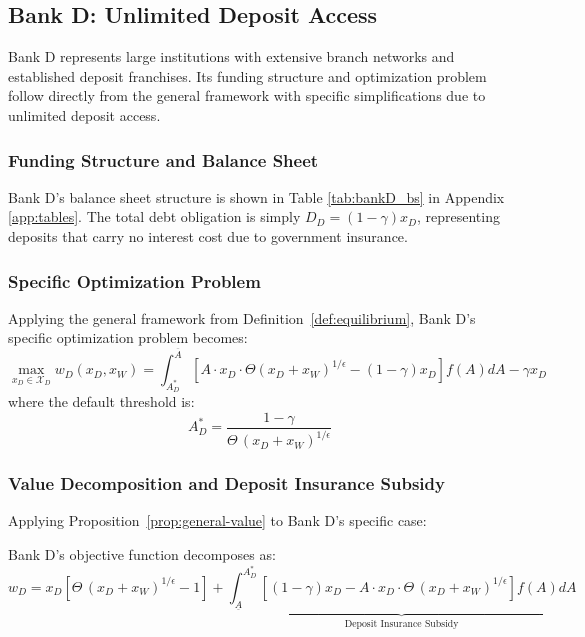 \documentclass[12pt]{article}
\begin{document}
\subsection{Bank D: Unlimited Deposit Access}
Bank D represents large institutions with extensive branch networks and established deposit franchises. Its funding structure and optimization problem follow directly from the general framework with specific simplifications due to unlimited deposit access.

\subsubsection{Funding Structure and Balance Sheet}
Bank D's balance sheet structure is shown in Table \ref{tab:bankD_bs} in Appendix \ref{app:tables}. The total debt obligation is simply $D_{D} = (1-\gamma)x_{D}$, representing deposits that carry no interest cost due to government insurance.

\subsubsection{Specific Optimization Problem}
Applying the general framework from Definition~\ref{def:equilibrium}, Bank D's specific optimization problem becomes:
\begin{equation}
    \max_{x_{D} \in \mathcal{X}_D} w_{D}(x_{D},x_{W}) = \int_{A_{D}^{*}}^{\overline{A}}[A \cdot x_{D} \cdot \Theta(x_{D}+x_{W})^{1/\epsilon} - (1-\gamma)x_{D}]f(A)dA - \gamma x_{D}
\end{equation}
where the default threshold is:
\begin{equation}
    A_{D}^{*} = \frac{1-\gamma}{\Theta\,(x_{D}+x_{W})^{1/\epsilon}}
\end{equation}

\subsubsection{Value Decomposition and Deposit Insurance Subsidy}
Applying Proposition~\ref{prop:general-value} to Bank D's specific case:

\begin{corollary}
Bank D's objective function decomposes as:
\begin{equation}
    w_{D} = x_{D}[\Theta\,(x_{D}+x_{W})^{1/\epsilon}-1] + \underbrace{\int_{\underline{A}}^{A_{D}^{*}}[(1-\gamma)x_{D} - A \cdot x_{D} \cdot \Theta\,(x_{D}+x_{W})^{1/\epsilon}]f(A)dA}_{\text{Deposit Insurance Subsidy}}
\end{equation}
\end{corollary}
\end{document}
